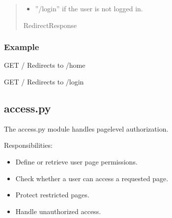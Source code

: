 \documentclass[letterpaper,10pt,english]{sphinxmanual}
\begin{document}
\begin{fulllineitems}
\begin{quote}
\begin{description}
\begin{description}
\begin{itemize}
\item {} 
\sphinxAtStartPar
”/login” if the user is not logged in.

\end{itemize}

\end{description}


\sphinxAtStartPar
RedirectResponse

\end{description}\end{quote}
\subsubsection*{Example}
\begin{description}
\sphinxAtStartPar
GET /
Redirects to /home

\sphinxAtStartPar
GET /
Redirects to /login

\end{description}

\end{fulllineitems}



\subsection{access.py}
\label{\detokenize{modules:access-py}}
\sphinxAtStartPar
The access.py module handles page\sphinxhyphen{}level authorization.

\sphinxAtStartPar
Responsibilities:
\begin{itemize}
\item {} 
\sphinxAtStartPar
Define or retrieve user page permissions.

\item {} 
\sphinxAtStartPar
Check whether a user can access a requested page.

\item {} 
\sphinxAtStartPar
Protect restricted pages.

\item {} 
\sphinxAtStartPar
Handle unauthorized access.

\end{itemize}

\sphinxAtStartPar
{}
\end{document}
